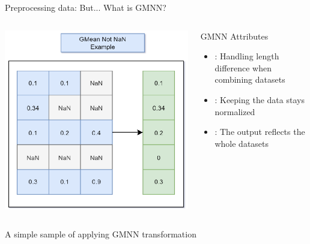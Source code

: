 \documentclass[compress, mathserif, fleqn, 10pt]{beamer}
\begin{document}
	\begin{frame}{Preprocessing data: But... What is GMNN?}
		\begin{columns}
			\begin{column}{0.5\textwidth}
				\includegraphics[width=\textwidth]{images/gmnn.eps}
			\end{column}
			\begin{column}{0.5\textwidth}
				\begin{block}{GMNN Attributes}
					\begin{itemize}
						\item {}: Handling length difference when combining datasets
						\smallskip
						
						\item {}: Keeping the data stays normalized
						\smallskip
						
						\item {}: The output reflects the whole datasets
						\smallskip
					\end{itemize}
				\end{block}
				\vspace*{1cm}
			\end{column}
		\end{columns}
		\bigskip
		\centerline{A simple sample of applying GMNN transformation}
	\end{frame}
	
\end{document}
